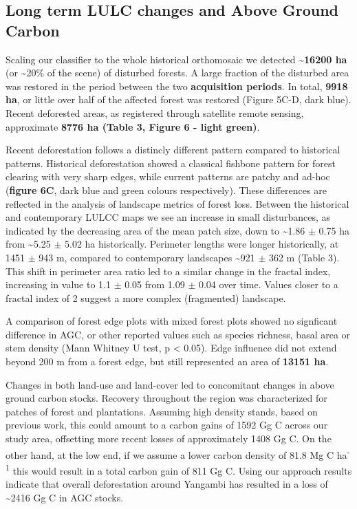 \documentclass[remote sensing,article,submit,moreauthors,pdftex]{mdpi}
\begin{document}
\hypertarget{long-term-lulc-changes-and-above-ground-carbon}{%
\subsection{Long term LULC changes and Above Ground
Carbon}\label{long-term-lulc-changes-and-above-ground-carbon}}

Scaling our classifier to the whole historical orthomosaic we detected
\textbf{\textasciitilde{}16200 ha} (or \textasciitilde{}20\% of the
scene) of disturbed forests. A large fraction of the disturbed area was
restored in the period between the two \textbf{acquisition periods}. In
total, \textbf{9918 ha}, or little over half of the affected forest was
restored (Figure 5C-D, dark blue). Recent deforested areas, as
registered through satellite remote sensing, approximate \textbf{8776 ha
(Table 3, Figure 6 - light green)}.

Recent deforestation follows a distincly different pattern compared to
historical patterns. Historical deforestation showed a classical
fishbone pattern for forest clearing with very sharp edges, while
current patterns are patchy and ad-hoc (\textbf{figure 6C}, dark blue
and green colours respectively). These differences are reflected in the
analysis of landscape metrics of forest loss. Between the historical and
contemporary LULCC maps we see an increase in small disturbances, as
indicated by the decreasing area of the mean patch size, down to
\textasciitilde{}1.86 \(\pm\) 0.75 ha from \textasciitilde{}5.25 \(\pm\)
5.02 ha historically. Perimeter lengths were longer historically, at
1451 \(\pm\) 943 m, compared to contemporary landscapes
\textasciitilde{}921 \(\pm\) 362 m (Table 3). This shift in perimeter
area ratio led to a similar change in the fractal index, increasing in
value to 1.1 \(\pm\) 0.05 from 1.09 \(\pm\) 0.04 over time. Values
closer to a fractal index of 2 suggest a more complex (fragmented)
landscape.

A comparison of forest edge plots with mixed forest plots showed no
signficant difference in AGC, or other reported values such as species
richness, basal area or stem density (Mann Whitney U test, p \textless{}
0.05). Edge influence did not extend beyond 200 m from a forest edge,
but still represented an area of \textbf{13151 ha}.

Changes in both land-use and land-cover led to concomitant changes in
above ground carbon stocks. Recovery throughout the region was
characterized for patches of forest and plantations. Assuming high
density stands, based on previous work, this could amount to a carbon
gains of 1592 Gg C across our study area, offsetting more recent losses
of approximately 1408 Gg C. On the other hand, at the low end, if we
assume a lower carbon density of 81.8 Mg C ha\textsuperscript{-1} this
would result in a total carbon gain of 811 Gg C. Using our approach
results indicate that overall deforestation around Yangambi has resulted
in a loss of \textasciitilde{}2416 Gg C in AGC stocks.
\end{document}
